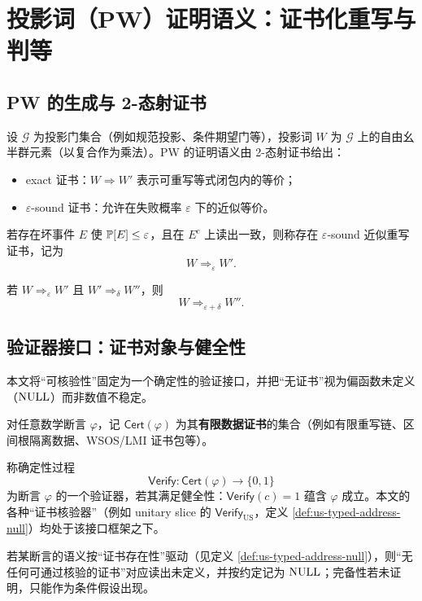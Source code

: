 \section{投影词（PW）证明语义：证书化重写与判等}\label{sec:projword}

\subsection{PW 的生成与 2-态射证书}
设 $\mathcal{G}$ 为投影门集合（例如规范投影、条件期望门等），投影词 $W$ 为 $\mathcal{G}$ 上的自由幺半群元素（以复合作为乘法）。PW 的证明语义由 2-态射证书给出：
\begin{itemize}
  \item exact 证书：$W\Rightarrow W'$ 表示可重写等式闭包内的等价；
  \item $\varepsilon$-sound 证书：允许在失败概率 $\varepsilon$ 下的近似等价。
\end{itemize}

\begin{definition}\label{def:eps-sound}
若存在坏事件 $E$ 使 $\mathbb{P}[E]\le \varepsilon$，且在 $E^c$ 上读出一致，则称存在 $\varepsilon$-sound 近似重写证书，记为
$$
W \Rightarrow_\varepsilon W'.
$$
\end{definition}

\begin{proposition}[误差预算可加复合]\label{prop:eps-add}
若 $W\Rightarrow_\varepsilon W'$ 且 $W'\Rightarrow_\delta W''$，则
$$
W\Rightarrow_{\varepsilon+\delta} W''.
$$
\end{proposition}

\subsection{验证器接口：证书对象与健全性}\label{subsec:pw-verifier-interface}
本文将“可核验性”固定为一个确定性的验证接口，并把“无证书”视为偏函数未定义（$\mathrm{NULL}$）而非数值不稳定。\par

\begin{definition}[证书对象与验证器]\label{def:cert-verify}
对任意数学断言 $\varphi$，记 $\mathsf{Cert}(\varphi)$ 为其\textbf{有限数据证书}的集合（例如有限重写链、区间根隔离数据、WSOS/LMI 证书包等）。\par
称确定性过程
$$
\mathsf{Verify}:\mathsf{Cert}(\varphi)\to\{0,1\}
$$
为断言 $\varphi$ 的一个验证器，若其满足健全性：$\mathsf{Verify}(c)=1$ 蕴含 $\varphi$ 成立。本文的各种“证书核验器”（例如 unitary slice 的 $\mathsf{Verify}_{\mathrm{US}}$，定义 \ref{def:us-typed-address-null}）均处于该接口框架之下。\par
若某断言的语义按“证书存在性”驱动（见定义 \ref{def:us-typed-address-null}），则“无任何可通过核验的证书”对应读出未定义，并按约定记为 $\mathrm{NULL}$；完备性若未证明，只能作为条件假设出现。
\end{definition}

